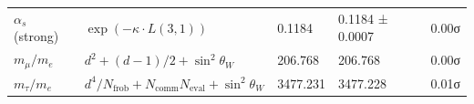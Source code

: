 \documentclass[12pt,a4paper]{article}
\begin{document}
\begin{longtable}[]{@{}lllll@{}}
\begin{minipage}[t]{0.13\columnwidth}\raggedright
\(\alpha_s\) (strong)\strut
\end{minipage} & \begin{minipage}[t]{0.25\columnwidth}\raggedright
\(\exp(-\kappa \cdot L(3,1))\)\strut
\end{minipage} & \begin{minipage}[t]{0.20\columnwidth}\raggedright
0.1184\strut
\end{minipage} & \begin{minipage}[t]{0.21\columnwidth}\raggedright
0.1184 ± 0.0007\strut
\end{minipage} & \begin{minipage}[t]{0.07\columnwidth}\raggedright
0.00σ\strut
\end{minipage}\tabularnewline
\begin{minipage}[t]{0.13\columnwidth}\raggedright
\(m_\mu/m_e\)\strut
\end{minipage} & \begin{minipage}[t]{0.25\columnwidth}\raggedright
\(d^2 + (d-1)/2 + \sin^2\theta_W\)\strut
\end{minipage} & \begin{minipage}[t]{0.20\columnwidth}\raggedright
206.768\strut
\end{minipage} & \begin{minipage}[t]{0.21\columnwidth}\raggedright
206.768\strut
\end{minipage} & \begin{minipage}[t]{0.07\columnwidth}\raggedright
0.00σ\strut
\end{minipage}\tabularnewline
\begin{minipage}[t]{0.13\columnwidth}\raggedright
\(m_\tau/m_e\)\strut
\end{minipage} & \begin{minipage}[t]{0.25\columnwidth}\raggedright
\(d^4/N_{\text{frob}} + N_{\text{comm}}N_{\text{eval}} + \sin^2\theta_W\)\strut
\end{minipage} & \begin{minipage}[t]{0.20\columnwidth}\raggedright
3477.231\strut
\end{minipage} & \begin{minipage}[t]{0.21\columnwidth}\raggedright
3477.228\strut
\end{minipage} & \begin{minipage}[t]{0.07\columnwidth}\raggedright
0.01σ\strut
\end{minipage}\tabularnewline

\end{longtable}
\end{document}

